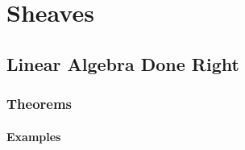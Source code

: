 \chapter{Sheaves}

\section{Linear Algebra Done Right}

\subsection{Theorems}

\subsubsection{Examples}

\cite{Tu_Diff_forms_in_AT}